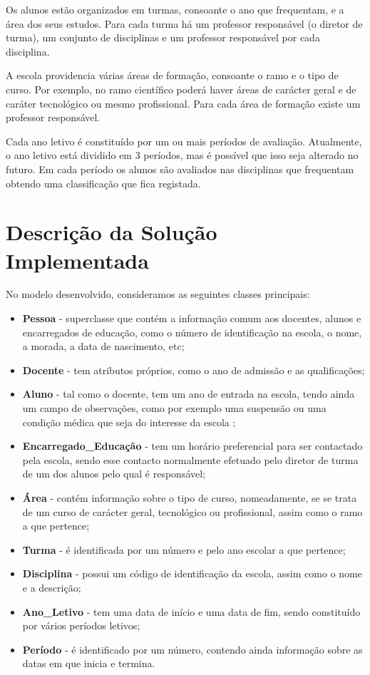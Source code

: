 \documentclass[12pt,a4paper,reqno]{report}
\numberwithin{figure}{section}
\numberwithin{equation}{section}
\begin{document}
Os alunos estão organizados em turmas, consoante o ano que frequentam, e a área dos seus estudos. Para cada turma há um professor responsável (o diretor de turma), um conjunto de disciplinas e um professor responsável por cada disciplina.

A escola providencia várias áreas de formação, consoante o ramo e o tipo de curso. Por exemplo, no ramo científico poderá haver áreas de carácter geral e de caráter tecnológico ou mesmo profissional. Para cada área de formação existe um professor responsável.

Cada ano letivo é constituído por um ou mais períodos de avaliação. Atualmente, o ano letivo está dividido em 3 períodos, mas é possível que isso seja alterado no futuro. Em cada período os alunos são avaliados nas disciplinas que frequentam obtendo uma classificação que fica registada.

\chapter{Descrição da Solução Implementada}

No modelo desenvolvido, consideramos as seguintes classes principais:
\begin{itemize}
\item \textbf{Pessoa} - superclasse que contém a informação comum aos docentes, alunos e encarregados de educação, como o número de identificação na escola, o nome, a morada, a data de nascimento, etc;
\item \textbf{Docente} - tem atributos próprios, como o ano de admissão e as qualificações;
\item \textbf{Aluno} - tal como o docente, tem um ano de entrada na escola, tendo ainda um campo de observações, como por exemplo uma suspensão ou uma condição médica que seja do interesse da escola ;
\item \textbf{Encarregado\_Educação} - tem um horário preferencial para ser contactado pela escola, sendo esse contacto normalmente efetuado pelo diretor de turma de um dos alunos pelo qual é responsável;
\item \textbf{Área} - contém informação sobre o tipo de curso, nomeadamente, se se trata de um curso de carácter geral, tecnológico ou profissional, assim como o ramo a que pertence;
\item \textbf{Turma} - é identificada por um número e pelo ano escolar a que pertence;
\item \textbf{Disciplina} - possui um código de identificação da escola, assim como o nome e a descrição;
\item \textbf{Ano\_Letivo} - tem uma data de início e uma data de fim, sendo constituído por vários períodos letivos;
\item \textbf{Período} - é identificado por um número, contendo ainda informação sobre as datas em que inicia e termina.
\end{itemize}
\end{document}
